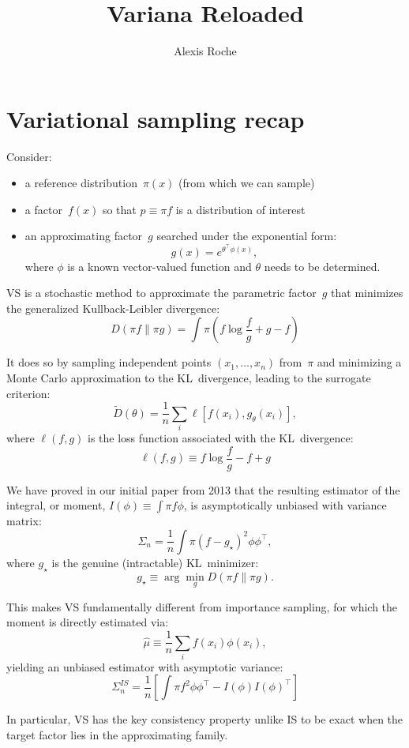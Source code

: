 \documentclass{article}
\title{Variana Reloaded}
\author{Alexis Roche}
\begin{document}
\maketitle


\section{Variational sampling recap}

Consider:
\begin{itemize}
\item a reference distribution~$\pi(x)$ (from which we can sample)
\item a factor~$f(x)$ so that $p\equiv \pi f$ is a distribution of interest
\item an approximating factor~$g$ searched under the exponential form:
  $$
  g(x) = e^{\theta^\top \phi(x)},
  $$ where $\phi$ is a known vector-valued function and $\theta$ needs
  to be determined.
\end{itemize}

VS is a stochastic method to approximate the parametric factor~$g$ that minimizes the generalized Kullback-Leibler divergence:
$$
D(\pi f\|\pi g)
= \int \pi (f \log \frac{f}{g} + g - f)
$$

It does so by sampling independent points $(x_1,\ldots,x_n)$ from~$\pi$ and minimizing a Monte Carlo approximation to the KL~divergence, leading to the surrogate criterion:
$$
\tilde{D}(\theta) = \frac{1}{n} \sum_i \ell[ f(x_i), g_\theta(x_i) ],
$$
where $\ell(f, g)$ is the loss function associated with the KL~divergence:
$$
\ell(f, g) \equiv f \log \frac{f}{g} - f + g
$$
  
We have proved in our initial paper from 2013 that the resulting estimator of the integral, or moment, $I(\phi) \equiv \int \pi f \phi$, is asymptotically unbiased with variance matrix:
$$
\Sigma_n = \frac{1}{n} \int \pi (f - g_\star)^2 \phi \phi^\top,
$$
where $g_\star$ is the genuine (intractable) KL~minimizer:
$$
g_\star \equiv \arg\min_g D(\pi f\|\pi g).
$$

This makes VS fundamentally different from importance sampling, for which the moment is directly estimated via:
$$
\hat{\mu} \equiv \frac{1}{n} \sum_i f(x_i)\phi(x_i),
$$
yielding an unbiased estimator with asymptotic variance:
$$
\Sigma_n^{IS} = \frac{1}{n} \left[
\int \pi f^2 \phi \phi^\top
- I(\phi) I(\phi)^\top
\right]
$$

In particular, VS has the key consistency property unlike IS to be exact when the target factor lies in the approximating family. 
\end{document}

